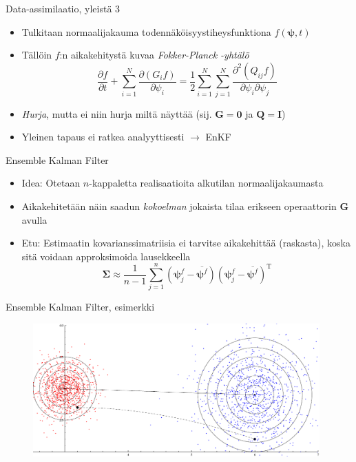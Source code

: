 \documentclass{beamer}
\begin{document}
\begin{frame}{Data-assimilaatio, yleistä 3}

\begin{itemize}
\item Tulkitaan normaalijakauma todennäköisyystiheysfunktiona $f(\boldsymbol{\psi},t)$
\item Tällöin $f$:n aikakehitystä kuvaa \emph{Fokker-Planck -yhtälö}
\[
\frac{\partial f}{\partial t} + \sum_{i=1}^N \frac{\partial \left ( G_i f \right )}{\partial \psi_i} = \frac{1}{2} \sum_{i=1}^N \sum_{j=1}^N \frac{\partial^2 \left ( Q_{ij} f \right )}{\partial \psi_i \partial \psi_j}
\]
\item \emph{Hurja}, mutta ei niin hurja miltä näyttää (sij. $\mathbf{G} = \mathbf{0}$ ja $\mathbf{Q} = \mathbf{I}$) 
\item Yleinen tapaus ei ratkea analyyttisesti $\rightarrow$ EnKF
\end{itemize}

\end{frame}

\begin{frame}{Ensemble Kalman Filter}

\begin{itemize}
\item Idea: Otetaan $n$-kappaletta realisaatioita alkutilan normaalijakaumasta
\item Aikakehitetään näin saadun \emph{kokoelman} jokaista tilaa erikseen operaattorin $\boldsymbol{G}$ avulla
\item Etu: Estimaatin kovarianssimatriisia ei tarvitse aikakehittää (raskasta), koska sitä voidaan approksimoida lausekkeella
\[
\boldsymbol{\Sigma} \approx \frac{1}{n-1} \sum_{j=1}^n \left( \boldsymbol{\psi}^f_j - \overline{\boldsymbol{\psi}^f} \right) \left(\boldsymbol{\psi}^f_j - \overline{\boldsymbol{\psi}^f}  \right)^\mathrm{T}
\]
\end{itemize}

\end{frame}

\begin{frame}{Ensemble Kalman Filter, esimerkki}

\begin{figure}
\includegraphics[width=11cm]{enkf3.pdf}
\end{figure}

\end{frame}
\end{document}
